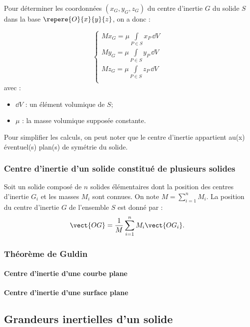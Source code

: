 \begin{methode}
Pour déterminer les coordonnées $\left(x_G,y_G,z_G\right)$ du centre d'inertie $G$ du solide $S$ dans la base $\repere{O}{x}{y}{z}$, on a donc :
\begin{multicols}{2}
$$
\left\{
\begin{array}{l}
M x_G =\mu \int\limits_{P\in S} x_P \,\dd V \\
M y_G =\mu \int\limits_{P\in S} y_P \,\dd V \\
M z_G =\mu \int\limits_{P\in S} z_P \,\dd V \\
\end{array}
\right. 
$$
avec : 
\begin{itemize}
  \item $\dd V$ : un élément volumique de $S$;
  \item $\mu$ : la masse volumique supposée constante.
\end{itemize}
Pour simplifier les calculs, on peut noter que le centre d'inertie appartient au(x) éventuel(s) plan(s) de symétrie du solide.

\end{multicols}



\end{methode}

\subsubsection{Centre d'inertie d'un solide constitué de plusieurs solides}
Soit un solide composé de $n$ solides élémentaires dont la position des centres d'inertie $G_i$ et les masses $M_i$ sont connues. On note $M=\sum\limits_{i=1}^{n}M_i$.  La position du centre d'inertie $G$ de l'ensemble $S$ est donné par :
$$\vect{OG}=\dfrac{1}{M}\sum\limits_{i=1}^{n}M_i \vect{OG_i} .$$


\subsubsection{Théorème de Guldin}
\paragraph{Centre d'inertie d'une courbe plane}
\paragraph{Centre d'inertie d'une surface plane}

\subsection{Grandeurs inertielles d'un solide}
